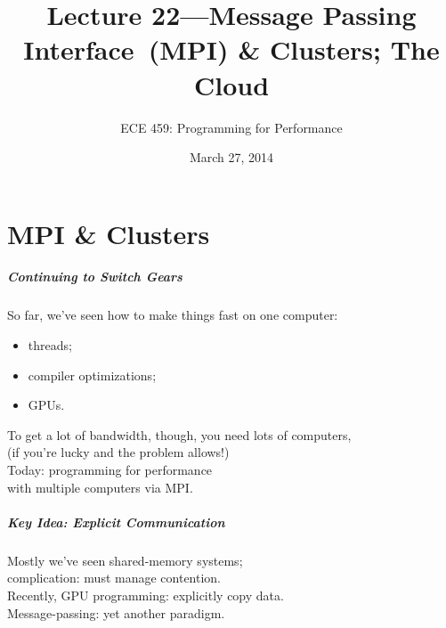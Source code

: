 \documentclass[aspectratio=43]{beamer}
\title{Lecture 22---Message Passing Interface~(MPI) \& Clusters; The Cloud}
\subtitle{ECE 459: Programming for Performance}
\date{March 27, 2014}
\newenvironment{changemargin}[1]{%
  \begin{list}{}{%
    \setlength{\topsep}{0pt}%
    \setlength{\leftmargin}{#1}%
    \setlength{\rightmargin}{1em}
    \setlength{\listparindent}{\parindent}%
    \setlength{\itemindent}{\parindent}%
    \setlength{\parsep}{\parskip}%
  }%
  \item[]}{\end{list}}
\begin{document}
\begin{frame}[plain]
  \titlepage
\end{frame}

\part{MPI \& Clusters}
\frame{\partpage}


\begin{frame}
  \frametitle{Continuing to Switch Gears}

  \begin{changemargin}{1cm}

  So far, we've seen how to make things fast on one computer:
\begin{itemize}
\item threads;
\item compiler optimizations;
\item GPUs.
\end{itemize}
  To get a lot of bandwidth, though, you need lots of computers, \\
   \qquad (if you're lucky and the problem allows!)\\[1em]

  Today: programming for performance \\ \qquad with multiple computers via MPI.

  \end{changemargin}
\end{frame}

\begin{frame}
  \frametitle{Key Idea: Explicit Communication}

  \begin{changemargin}{2cm}
  Mostly we've seen shared-memory systems;\\
  \qquad complication: must manage contention.\\[1em]

  Recently, GPU programming: explicitly copy data.\\[1em]

  Message-passing: yet another paradigm.

  \end{changemargin}
\end{frame}
\end{document}
